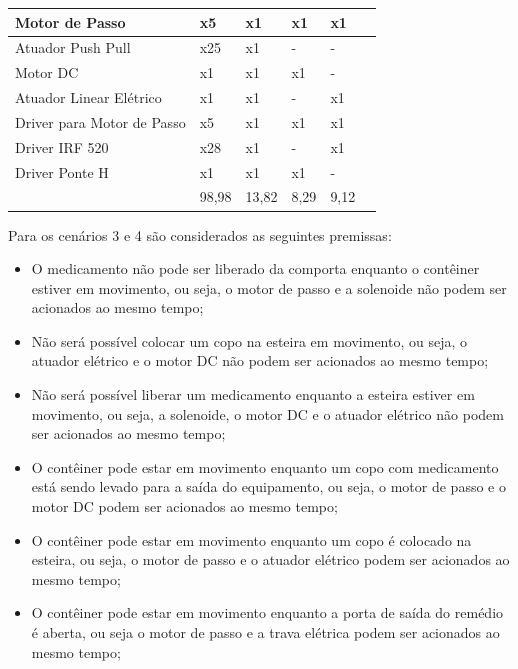 \begin{table}[H]
\begin{adjustbox}{max width = \textwidth}
\begin{tabular}{|L{5cm}|C{2cm}|C{2cm}|C{2cm}|C{2cm}|C{2cm}|}
             \\ \hline
              Motor de Passo & x5 & x1 & x1 & x1
             \\ \hline
             Atuador Push Pull & x25	 & x1 & - & -
             \\ \hline
                Motor DC & x1 & x1 & x1 & -
             \\ \hline
                 Atuador Linear Elétrico & x1 & x1 & - & x1
             \\ \hline
               Driver para Motor de Passo & x5 & x1 & x1 & x1
             \\ \hline
                Driver IRF 520 & x28 & x1 & - & x1
             \\ \hline
                  Driver Ponte H & x1 & x1 & x1 & -
             \\ \hline
              & 98,98 & 13,82 & 8,29 & 9,12 \\
             \hline
        \end{tabular}
    \end{adjustbox}
\end{table}

Para os cenários 3 e 4 são considerados as seguintes premissas: 
    
    \begin{itemize}
        
        \item O medicamento não pode ser liberado da comporta enquanto o contêiner estiver em movimento, ou seja, o motor de passo e a solenoide não podem ser acionados ao mesmo tempo;
        
        \item Não será possível colocar um copo na esteira em movimento, ou seja, o atuador elétrico e o motor DC não podem ser acionados ao mesmo tempo;
        
        \item Não será possível liberar um medicamento enquanto a esteira estiver em movimento, ou seja, a solenoide, o motor DC e o atuador elétrico não podem ser acionados ao mesmo tempo;
        
        \item O contêiner pode estar em movimento enquanto um copo com medicamento está sendo levado para a saída do equipamento, ou seja, o motor de passo e o motor DC podem ser acionados ao mesmo tempo;
        
        \item O contêiner pode estar em movimento enquanto um copo é colocado na esteira, ou seja, o motor de passo e o atuador elétrico podem ser acionados ao mesmo tempo;
        
        \item O contêiner pode estar em movimento enquanto a porta de saída do remédio é aberta, ou seja o motor de passo e a trava elétrica podem ser acionados ao mesmo tempo;

    \end{itemize}

